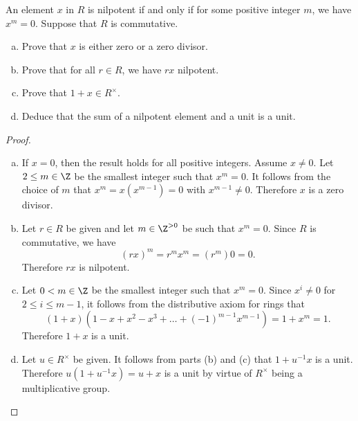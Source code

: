 \documentclass[10pt]{amsart}
\begin{document}
\begin{thm}
  An element $x$ in $R$ is nilpotent if and only if for some positive integer $m$, we have $x^m = 0$.
  Suppose that $R$ is commutative.
  \begin{enumerate}[(a)]
  \item
    Prove that $x$ is either zero or a zero divisor.
  \item
    Prove that for all $r \in R$, we have $rx$ nilpotent.
  \item
    Prove that $1 + x \in R^\times$.
  \item
    Deduce that the sum of a nilpotent element and a unit is a unit.
  \end{enumerate}
  \begin{proof}
    \begin{enumerate}[(a)]
    \item
      If $x = 0$, then the result holds for all positive integers.
      Assume $x \neq 0$.
      Let $2 \leq m \in \Z$ be the smallest integer such that $x^m = 0$.
      It follows from the choice of $m$ that $x^m = x(x^{m-1}) = 0$ with $x^{m-1} \neq 0$.
      Therefore $x$ is a zero divisor.
    \item
      Let $r \in R$ be given and let $m \in \Z^{> 0}$ be such that $x^m = 0$.
      Since $R$ is commutative, we have 
      $$(rx)^m = r^mx^m = (r^m)0 = 0.$$
      Therefore $rx$ is nilpotent.
    \item
      Let $0 < m \in \Z$ be the smallest integer such that $x^m = 0$.
      Since $x^{i} \neq 0$ for $2 \leq i \leq m - 1$, it follows from the distributive axiom for rings that
      $$(1 + x)(1 - x + x^2 - x^3 + \ldots + (-1)^{m-1}x^{m-1}) = 1 + x^m = 1.$$
      Therefore $1+x$ is a unit.
    \item
      Let $u \in R^\times$ be given.
      It follows from parts (b) and (c) that $1 + u^{-1}x$ is a unit.
      Therefore $u(1 + u^{-1}x) = u + x$ is a unit by virtue of $R^\times$ being a multiplicative group.
    \end{enumerate}
  \end{proof}
\end{thm}
\end{document}
